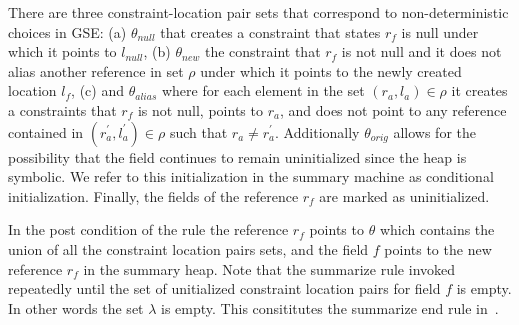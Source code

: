 There are three constraint-location pair sets that correspond to
non-deterministic choices in GSE: (a) $\theta_\mathit{null}$ that
creates a constraint that states $r_f$ is null under which it points
to $l_\mathit{null}$, (b) $\theta_\mathit{new}$ the constraint that
$r_f$ is not null and it does not alias another reference in set
$\rho$ under which it points to the newly created location $l_f$, (c)
and $\theta_\mathit{alias}$ where for each element in the set $(r_a,
l_a) \in \rho$ it creates a constraints that $r_f$ is not null, points
to $r_a$, and does not point to any reference contained in
$(r_a^\prime, l_a^\prime) \in \rho$ such that $r_a \neq
r_a^\prime$. Additionally $\theta_\mathit{orig}$ allows for the
possibility that the field continues to remain uninitialized since the
heap is symbolic. We refer to this initialization in the summary
machine as conditional initialization. Finally, the fields of the
reference $r_f$ are marked as uninitialized.

In the post condition of the rule the reference $r_f$ points to
$\theta$ which contains the union of all the constraint location pairs
sets, and the field $f$ points to the new reference $r_f$ in the
summary heap.  Note that the summarize rule invoked repeatedly until
the set of unitialized constraint location pairs for field $f$ is
empty. In other words the set $\lambda$ is empty. This consititutes
the summarize end rule in~.


